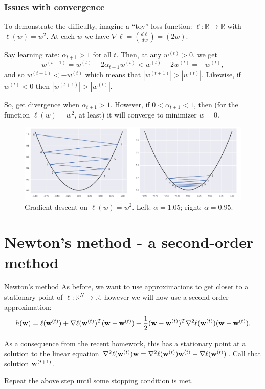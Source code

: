 \documentclass{beamer}
\begin{document}
\begin{frame}
    \frametitle{Issues with convergence}
    To demonstrate the difficulty, imagine a ``toy'' loss function: $\ell:\mathbb R\to\mathbb R$ with $\ell(w) = w^2$. At each $w$ we have $\nabla\ell = \left(\frac{d\ell}{dw}\right) = (2w)$. 

    \pause
    Say learning rate: $\alpha_{t+1} > 1$ for all $t$. Then, at any $w^{(t)} > 0$, we get 
        \[w^{(t+1)} = w^{(t)} - 2\alpha_{t+1} w^{(t)} < w^{(t)} - 2w^{(t)} = -w^{(t)},\]
    and so $w^{(t+1)}<-w^{(t)}$ which means that $|w^{(t+1)}| > |w^{(t)}|$. \pause Likewise, if $w^{(t)} < 0$ then $|w^{(t+1)}| > |w^{(t)}|$.
    
    \pause
    So, get divergence when $\alpha_{t+1} > 1$. However, if $0< \alpha_{t+1} < 1$, then (for the function $\ell(w)=w^2$, at least) it will converge to minimizer $w=0$.

    \pause
    \begin{figure}
    \includegraphics[height=0.3\textheight]{../../Images/GD-choosing-lr.png}
    \caption{Gradient descent on $\ell(w) = w^2$. Left: $\alpha = 1.05$; right: $\alpha = 0.95$.}
    \end{figure}
\end{frame}

\section{Newton's method - a second-order method}

\begin{frame}{Newton's method}
    As before, we want to use approximations to get closer to a stationary point of $\ell:\mathbb R^N\to\mathbb R$, however we will now use a second order approximation:
    \[h({\bf w}) = \ell({\bf w}^{(t)}) + \nabla\ell({\bf w}^{(t)})^T({\bf w} - {\bf w}^{(t)}) 
    + \frac12({\bf w} - {\bf w}^{(t)})^T\nabla^2\ell({\bf w}^{(t)})({\bf w}-{\bf w}^{(t)}).\]

    \pause 
    As a consequence from the recent homework, this has a stationary point at a solution to the linear equation $\nabla^2\ell({\bf w}^{(t)}){\bf w} = \nabla^2\ell({\bf w}^{(t)}){\bf w}^{(t)} - \nabla\ell({\bf w}^{(t)})$. Call that solution ${\bf w}^{(t+1)}$.

    Repeat the above step until some stopping condition is met.
\end{frame}
\end{document}
